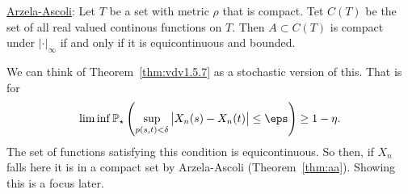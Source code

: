 \begin{remark*}
	\underline{Arzela-Ascoli}: Let \(T\) be a set with metric  \(\rho\) that is compact. Tet  \(C(T)\) be the set of all real valued continous functions on  \(T\). Then  \(A \subset C(T)\) is compact under  \(\left|\cdot\right|_\infty\) if and only if it is equicontinuous and bounded.

	We can think of Theorem~\ref{thm:vdv1.5.7} as a stochastic version of this. That is for
	\[
		\lim\inf \P_\star\left(\sup_{p(s,t)<\delta}\left|X_n(s) - X_n(t)\right|\leq \eps\right) \geq 1-\eta
	.\] 
	The set of functions satisfying this condition is equicontinuous. So then, if \(X_n\) falls here it is in a compact set by  Arzela-Ascoli (Theorem~\ref{thm:aa}). Showing this is a focus later.
\end{remark*}


